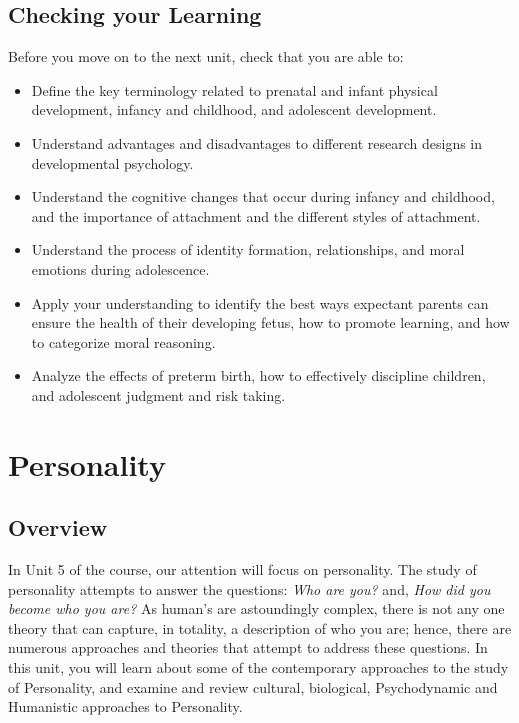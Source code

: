 \documentclass[
]{book}
\providecommand{\tightlist}{%
  \setlength{\itemsep}{0pt}\setlength{\parskip}{0pt}}
\begin{document}
\hypertarget{checking-your-learning-2}{%
\section*{Checking your Learning}\label{checking-your-learning-2}}

\begin{progress}
Before you move on to the next unit, check that you are able to:

\begin{itemize}
\tightlist
\item
  Define the key terminology related to prenatal and infant physical development, infancy and childhood, and adolescent development.\\
\item
  Understand advantages and disadvantages to different research designs in developmental psychology.\\
\item
  Understand the cognitive changes that occur during infancy and childhood, and the importance of attachment and the different styles of attachment.\\
\item
  Understand the process of identity formation, relationships, and moral emotions during adolescence.\\
\item
  Apply your understanding to identify the best ways expectant parents can ensure the health of their developing fetus, how to promote learning, and how to categorize moral reasoning.\\
\item
  Analyze the effects of preterm birth, how to effectively discipline children, and adolescent judgment and risk taking.
\end{itemize}
\end{progress}

\hypertarget{personality}{%
\chapter{Personality}\label{personality}}

\hypertarget{overview-3}{%
\section*{Overview}\label{overview-3}}

In Unit 5 of the course, our attention will focus on personality. The study of personality attempts to answer the questions: \emph{Who are you?} and, \emph{How did you become who you are?} As human's are astoundingly complex, there is not any one theory that can capture, in totality, a description of who you are; hence, there are numerous approaches and theories that attempt to address these questions. In this unit, you will learn about some of the contemporary approaches to the study of Personality, and examine and review cultural, biological, Psychodynamic and Humanistic approaches to Personality.
\end{document}
